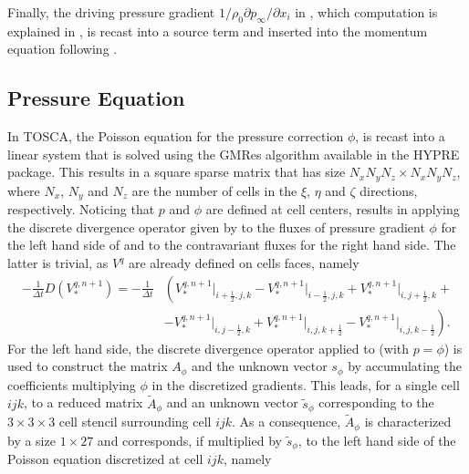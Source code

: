 Finally, the driving pressure gradient $1/\rho_0\partial p_\infty/\partial x_i$ in , which computation is explained in , is recast into a source term and inserted into the momentum equation following .

\subsection{Pressure Equation}
\label{subsec:pressureDiscretization}
In TOSCA, the Poisson equation  for the pressure correction $\phi$, is recast into a linear system that is solved using the GMRes algorithm available in the HYPRE package. This results in a square sparse matrix that has size $N_xN_yN_z\times N_xN_yN_z$, where $N_x$, $N_y$ and $N_z$ are the number of cells in the $\xi$, $\eta$ and $\zeta$ directions, respectively. Noticing that $p$ and $\phi$ are defined at cell centers,  results in applying the discrete divergence operator given by  to the fluxes of pressure gradient $\phi$ for the left hand side of  and to the contravariant fluxes for the right hand side. The latter is trivial, as $V^q$ are already defined on cells faces, namely
\begin{align}
	-\frac{1}{\Delta t}D\left(V^{q,n+1}_*\right) = -\frac{1}{\Delta t}&\left( 
	V^{q,n+1}_*\bigg|_{i+\frac{1}{2},j,k} -    
	V^{q,n+1}_*\bigg|_{i-\frac{1}{2},j,k} +
	V^{q,n+1}_*\bigg|_{i,j+\frac{1}{2},k} + \right. \nonumber \\
    &\left.-V^{q,n+1}_*\bigg|_{i,j-\frac{1}{2},k} +
	V^{q,n+1}_*\bigg|_{i,j,k+\frac{1}{2}} - 
	 V^{q,n+1}_*\bigg|_{i,j,k-\frac{1}{2}} \right). \label{eq:rhsPoisson}
\end{align}
For the left hand side, the discrete divergence operator applied to  (with $p=\phi$) is used to construct the matrix $A_\phi$ and the unknown vector $s_\phi$ by accumulating the coefficients multiplying $\phi$ in the discretized gradients. This leads, for a single cell $ijk$, to a reduced matrix $\widetilde{A}_\phi$ and an unknown vector $\widetilde{s}_\phi$ corresponding to the $3 \times 3 \times 3$ cell stencil surrounding cell $ijk$. As a consequence, $\widetilde{A}_\phi$ is characterized by a size $1\times27$ and corresponds, if multiplied by $\widetilde{s}_\phi$, to the left hand side of the Poisson equation discretized at cell $ijk$, namely
